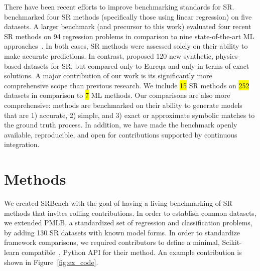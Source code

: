 There have been recent efforts to improve benchmarking standards for SR.
\citet{zegklitzBenchmarkingStateoftheartSymbolic2020} benchmarked four SR methods (specifically those using linear regression) on five datasets. 
A larger benchmark (and precursor to this work) evaluated four recent SR methods on 94 regression problems in comparison to nine state-of-the-art ML approaches~\cite{orzechowskiWhereAreWe2018}. 
In both cases, SR methods were assessed solely on their ability to make accurate predictions. 
In contrast, \citet{udrescuAIFeynmanPhysicsInspired2020} proposed 120 new synthetic, physics-based datasets for SR, but compared only to Eureqa and only in terms of exact solutions. 
A major contribution of our work is its significantly more comprehensive scope than previous research.
We include \hl{15} SR methods on \hl{252} datasets in comparison to \hl{7} ML methods. 
Our comparisons are also more comprehensive: methods are benchmarked on their ability to generate models that are 1) accurate, 2) simple, and 3) exact or approximate symbolic matches to the ground truth process. 
In addition, we have made the benchmark openly available, reproducible, and open for contributions supported by continuous integration. 





\section{Methods}

We created SRBench with the goal of having a living benchmarking of SR methods that invites rolling contributions. 
In order to establish common datasets, we extended PMLB, a standardized set of regression and classification problems\cite{olsonPMLBLargeBenchmark2017d}, by adding 130 SR datasets with known model forms. 
In order to standardize framework comparisons, we required contributors to define a minimal, Scikit-learn compatible~\cite{pedregosaScikitlearnMachineLearning2011a}, Python API for their method. 
An example contribution is shown in Figure~\ref{fig:ex_code}.

